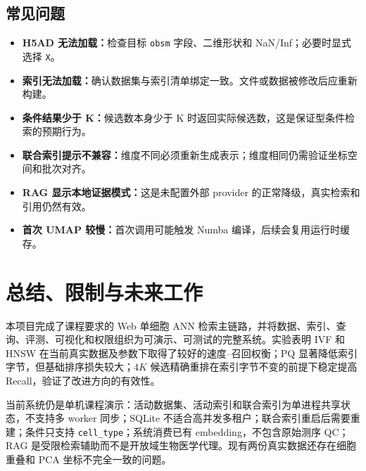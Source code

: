 \documentclass[11pt,a4paper]{article}
\newcommand{\code}[1]{\texttt{#1}}
\begin{document}
\subsection{常见问题}

\begin{itemize}
  \item \textbf{H5AD 无法加载：}检查目标 \code{obsm} 字段、二维形状和 NaN/Inf；必要时显式选择 \code{X}。
  \item \textbf{索引无法加载：}确认数据集与索引清单绑定一致。文件或数据被修改后应重新构建。
  \item \textbf{条件结果少于 K：}候选数本身少于 K 时返回实际候选数，这是保证型条件检索的预期行为。
  \item \textbf{联合索引提示不兼容：}维度不同必须重新生成表示；维度相同仍需验证坐标空间和批次对齐。
  \item \textbf{RAG 显示本地证据模式：}这是未配置外部 provider 的正常降级，真实检索和引用仍然有效。
  \item \textbf{首次 UMAP 较慢：}首次调用可能触发 Numba 编译，后续会复用运行时缓存。
\end{itemize}

\section{总结、限制与未来工作}

本项目完成了课程要求的 Web 单细胞 ANN 检索主链路，并将数据、索引、查询、评测、可视化和权限组织为可演示、可测试的完整系统。实验表明 IVF 和 HNSW 在当前真实数据及参数下取得了较好的速度--召回权衡；PQ 显著降低索引字节，但基础排序损失较大；$4K$ 候选精确重排在索引字节不变的前提下稳定提高 Recall，验证了改进方向的有效性。

当前系统仍是单机课程演示：活动数据集、活动索引和联合索引为单进程共享状态，不支持多 worker 同步；SQLite 不适合高并发多租户；联合索引重启后需要重建；条件只支持 \code{cell\_type}；系统消费已有 embedding，不包含原始测序 QC；RAG 是受限检索辅助而不是开放域生物医学代理。现有两份真实数据还存在细胞重叠和 PCA 坐标不完全一致的问题。
\end{document}
